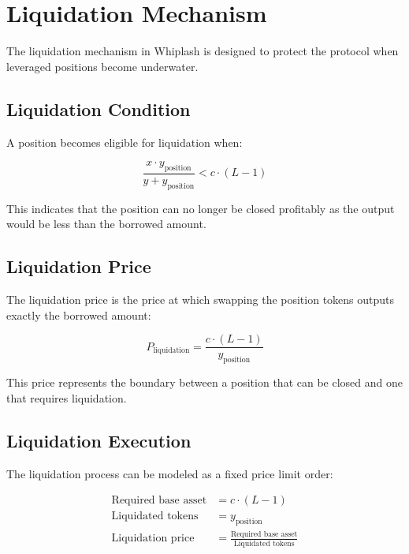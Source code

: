 \documentclass[11pt]{article}
\begin{document}
\section{Liquidation Mechanism}

The liquidation mechanism in Whiplash is designed to protect the protocol when leveraged positions become underwater.

\subsection{Liquidation Condition}

A position becomes eligible for liquidation when:

\begin{equation}
\frac{x \cdot y_{\text{position}}}{y + y_{\text{position}}} < c \cdot (L - 1)
\end{equation}

This indicates that the position can no longer be closed profitably as the output would be less than the borrowed amount.

\subsection{Liquidation Price}

The liquidation price is the price at which swapping the position tokens outputs exactly the borrowed amount:

\begin{equation}
P_{\text{liquidation}} = \frac{c \cdot (L - 1)}{y_{\text{position}}}
\end{equation}

This price represents the boundary between a position that can be closed and one that requires liquidation.

\subsection{Liquidation Execution}

The liquidation process can be modeled as a fixed price limit order:

\begin{equation}
\begin{aligned}
\text{Required base asset} &= c \cdot (L - 1) \\
\text{Liquidated tokens} &= y_{\text{position}} \\
\text{Liquidation price} &= \frac{\text{Required base asset}}{\text{Liquidated tokens}}
\end{aligned}
\end{equation}
\end{document}
